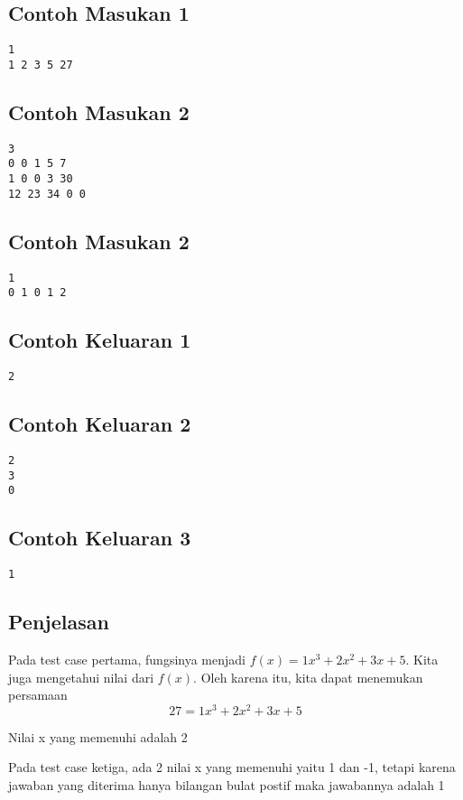 \documentclass{article}
\begin{document}
\begin{multicols}{2}
\subsection*{Contoh Masukan 1}
\begin{lstlisting}
1
1 2 3 5 27
\end{lstlisting}

\subsection*{Contoh Masukan 2}
\begin{lstlisting}
3
0 0 1 5 7
1 0 0 3 30
12 23 34 0 0
\end{lstlisting}

\subsection*{Contoh Masukan 2}
\begin{lstlisting}
1
0 1 0 1 2
\end{lstlisting}

\columnbreak
\subsection*{Contoh Keluaran 1}
\begin{lstlisting}
2
\end{lstlisting}

\subsection*{Contoh Keluaran 2}
\begin{lstlisting}
2
3
0
\end{lstlisting}

\subsection*{Contoh Keluaran 3}
\begin{lstlisting}
1
\end{lstlisting}
\end{multicols}


\subsection*{Penjelasan}
Pada test case pertama, fungsinya menjadi \(f(x) = 1x^3 + 2x^2 + 3x + 5\). Kita juga mengetahui nilai dari \(f(x)\). Oleh karena itu, kita dapat menemukan persamaan
\[27 = 1x^3 + 2x^2 + 3x + 5\]

Nilai x yang memenuhi adalah 2

Pada test case ketiga, ada 2 nilai x yang memenuhi yaitu 1 dan -1, tetapi karena jawaban yang diterima hanya bilangan bulat postif maka jawabannya adalah 1


\pagebreak
\end{document}
